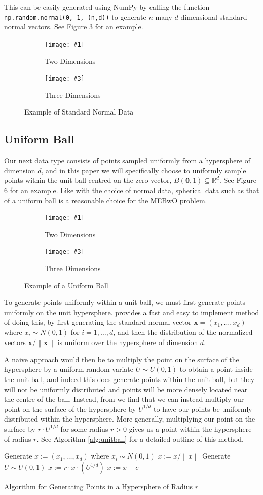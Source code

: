\documentclass[11pt,twoside]{report}
\newcommand{\norm}[1]{\left\lVert#1\right\rVert} %
\newcommand{\pairfigure}[6]{
    \begin{figure}[ht]
        \centering
        \begin{subfigure}[b]{0.475\textwidth}
            \centering
            \texttt{[image: \#1]}
            \caption{#2}
            \label{#6_#2}
        \end{subfigure}
        \hfill
        \begin{subfigure}[b]{0.475\textwidth}
            \centering
            \texttt{[image: \#3]}
            \caption{#4}
            \label{#6_#4}
        \end{subfigure}
        \caption{#5}
        \label{#6}
\end{figure}
}
\newcommand{\datafigure}[3]{
    \pairfigure{data_plots/#1_2d.png}{Two Dimensions}{data_plots/#1_3d.png}{Three Dimensions}{#2}{#3}
}
\theoremstyle{definition}
\numberwithin{theorem}{section}
\numberwithin{definition}{section}
\numberwithin{lemma}{section}
\numberwithin{proposition}{section}
\numberwithin{equation}{section}
\numberwithin{figure}{section}
\begin{document}
This can be easily generated using NumPy \cite{numpy} by calling the function \texttt{np.random.normal(0, 1, (n,d))} to generate $n$ many $d$-dimensional standard normal vectors. See Figure \ref{fig:normal} for an example.

\datafigure{normal}{Example of Standard Normal Data}{fig:normal}

\subsection{Uniform Ball}\label{uniform ball}
Our next data type consists of points sampled uniformly from a hypersphere of dimension $d$, and in this paper we will specifically choose to uniformly sample points within the unit ball centred on the zero vector, $B(\mathbf{0},1)\subseteq\mathbb{R}^d$. See Figure \ref{fig:unifball} for an example. Like with the choice of normal data, spherical data such as that of a uniform ball is a reasonable choice for the MEBwO problem.

\datafigure{uniform_ball}{Example of a Uniform Ball}{fig:unifball}

To generate points uniformly within a unit ball, we must first generate points uniformly on the unit hypersphere. \cite{hyperspheresurface} provides a fast and easy to implement method of doing this, by first generating the standard normal vector $\mathbf{x}=(x_1,\ldots,x_d)$ where $x_i\sim N(0,1)$ for $i=1,\ldots,d$, and then the distribution of the normalized vectors $\mathbf{x}/\norm{\mathbf{x}}$ is uniform over the hypersphere of dimension $d$.

A naive approach would then be to multiply the point on the surface of the hypersphere by a uniform random variate $U\sim U(0,1)$ to obtain a point inside the unit ball, and indeed this does generate points within the unit ball, but they will not be uniformly distributed and points will be more densely located near the centre of the ball. Instead, from \cite{eldredge} we find that we can instead multiply our point on the surface of the hypersphere by $U^{1/d}$ to have our points be uniformly distributed within the hypersphere. More generally, multiplying our point on the surface by $r\cdot U^{1/d}$ for some radius $r>0$ gives us a point within the hypersphere of radius $r$. See Algorithm \ref{alg:unitball} for a detailed outline of this method.

\begin{algorithm}[H]
    Generate $x:=(x_1,\ldots,x_d)$ where $x_i\sim N(0,1)$\;
    $x:=x/\norm{x}$\;
    Generate $U\sim U(0,1)$\;
    $x:=r\cdot x\cdot \left(U^{1/d}\right)$\;
    $x:= x+c$\;
    
    \caption{Algorithm for Generating Points in a Hypersphere of Radius $r$}
    \label{alg:unitball}
\end{algorithm}
\end{document}
